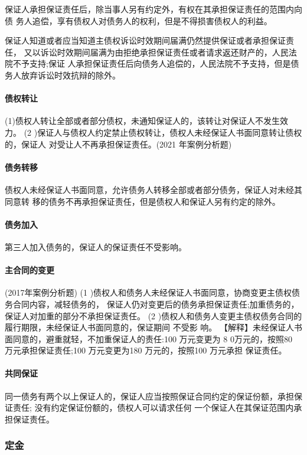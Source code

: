 \documentclass[UTF8,12pt]{ctexart}
\numberwithin{equation}{section} %
\numberwithin{figure}{section}
\numberwithin{table}{section}
\begin{document}
	保证人承担保证责任后，除当事人另有约定外，有权在其承担保证责任的范围内向债 务人追偿，享有债权人对债务人的权利，但是不得损害债权人的利益。
	
	保证人知道或者应当知道主债权诉讼时效期间届满仍然提供保证或者承担保证责任， 又以诉讼时效期间届满为由拒绝承担保证责任或者请求返还财产的，人民法院不予支持;保证 人承担保证责任后向债务人追偿的，人民法院不予支持，但是债务人放弃诉讼时效抗辩的除外。
	
	\paragraph{债权转让} (1)债权人转让全部或者部分债权，未通知保证人的，该转让对保证人不发生效力。
	(2 )保证人与债权人约定禁止债权转让，债权人未经保证人书面同意转让债权的，保证人 对受让人不再承担保证责任。(2021 年案例分析题)
	
	\paragraph{债务转移} 债权人未经保证人书面同意，允许债务人转移全部或者部分债务，保证人对未经其同意转 移的债务不再承担保证责任，但是债权人和保证人另有约定的除外。
	
	\paragraph{债务加入}
	第三人加入债务的，保证人的保证责任不受影响。
	
	\paragraph{主合同的变更}(2017年案例分析题)
	(1 )债权人和债务人未经保证人书面同意，协商变更主债权债务合同内容，减轻债务的， 保证人仍对变更后的债务承担保证责任;加重债务的，保证人对加重的部分不承担保证责任。 (2 )债权人和债务人变更主债权债务合同的履行期限，未经保证人书面同意的，保证期间 不受影 响。
	【解释】未经保证人书面同意的，避重就轻，不加重保证人的责任:100 万元变更为 8 0万元的，按照80 万元承担保证责任;100 万元变更为180 万元的，按照100 万元承担 保证责任。
	
	\paragraph{共同保证} 同一债务有两个以上保证人的，保证人应当按照保证合同约定的保证份额，承担保证责任; 没有约定保证份额的，债权人可以请求任何 一个保证人在其保证范围内承担保证责任。
	\subsubsection{定金}
\end{document}
